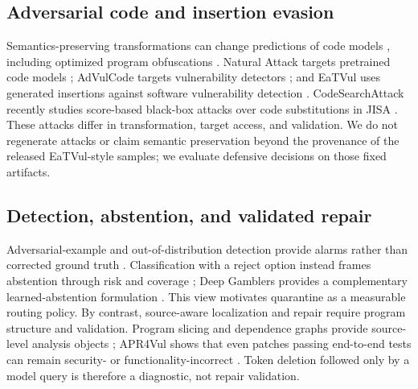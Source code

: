 \documentclass[a4paper,fleqn]{cas-dc}
\begin{document}
\subsection{Adversarial code and insertion evasion}

Semantics-preserving transformations can change predictions of code models \cite{yefet2020adversarial,ramakrishnan2020adversarial,rabin2020generalizability}, including optimized program obfuscations \cite{srikant2021optimized}. Natural Attack targets pretrained code models \cite{chen2022natural}; AdVulCode targets vulnerability detectors \cite{zhou2023advulcode}; and EaTVul uses generated insertions against software vulnerability detection \cite{liu2024eatvul}. CodeSearchAttack recently studies score-based black-box attacks over code substitutions in JISA \cite{pu2025codesearchattack}. These attacks differ in transformation, target access, and validation. We do not regenerate attacks or claim semantic preservation beyond the provenance of the released EaTVul-style samples; we evaluate defensive decisions on those fixed artifacts.

\subsection{Detection, abstention, and validated repair}

Adversarial-example and out-of-distribution detection provide alarms rather than corrected ground truth \cite{biggio2018wild,nist2024aml}. Classification with a reject option instead frames abstention through risk and coverage \cite{chow1970reject,geifman2017selective,geifman2019selectivenet}; Deep Gamblers provides a complementary learned-abstention formulation \cite{liu2019deepgamblers}. This view motivates quarantine as a measurable routing policy. By contrast, source-aware localization and repair require program structure and validation. Program slicing and dependence graphs provide source-level analysis objects \cite{weiser1984program,ferrante1987pdg}; APR4Vul shows that even patches passing end-to-end tests can remain security- or functionality-incorrect \cite{bui2024apr4vul}. Token deletion followed only by a model query is therefore a diagnostic, not repair validation.
\end{document}
